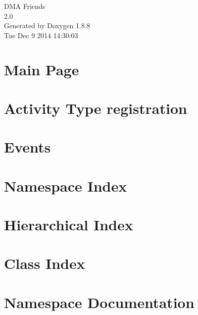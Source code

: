 \documentclass[twoside]{book}
\newcommand{\+}{\discretionary{\mbox{\scriptsize$\hookleftarrow$}}{}{}}
\newcommand{\clearemptydoublepage}{%
  \newpage{\pagestyle{empty}\cleardoublepage}%
}
\begin{document}
\hypersetup{pageanchor=false,
             bookmarks=true,
             bookmarksnumbered=true,
             pdfencoding=unicode
            }
\begin{titlepage}
\vspace*{7cm}
\begin{center}%
{\Large D\+M\+A Friends \\[1ex]\large 2.\+0 }\\
\vspace*{1cm}
{\large Generated by Doxygen 1.8.8}\\
\vspace*{0.5cm}
{\small Tue Dec 9 2014 14:30:03}\\
\end{center}
\end{titlepage}
\clearemptydoublepage
\tableofcontents
\clearemptydoublepage
{}
\hypersetup{pageanchor=true}

\chapter{Main Page}
\label{index}\hypertarget{index}{}
\chapter{Activity Type registration}
\label{df/d06/md_docs_ACTIVITY-TYPES}
\hypertarget{df/d06/md_docs_ACTIVITY-TYPES}{}

\chapter{Events}
\label{df/d0e/md_docs_EVENTS}
\hypertarget{df/d0e/md_docs_EVENTS}{}

\chapter{Namespace Index}

\chapter{Hierarchical Index}

\chapter{Class Index}

\chapter{Namespace Documentation}



\end{document}
